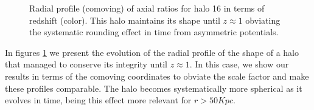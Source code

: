 \begin{figure}[!ht]
  \centering
  \hfill
  \caption{Radial profile (comoving) of axial ratios for halo 16 in terms of redshift (color). This halo maintains its shape until $z\approx 1$ obviating the systematic rounding effect in time from asymmetric potentials. }
  \label{fig:RedshiftGood}
\end{figure}

In figures \ref{fig:RedshiftGood} we present the evolution of the radial profile of the shape of a halo that managed to conserve its integrity until $z \approx 1$. In this case, we show our results in terms of the comoving coordinates to obviate the scale factor and make these profiles comparable. The halo becomes systematically more spherical as it evolves in time, being this effect more relevant for $r>50Kpc$.\\

